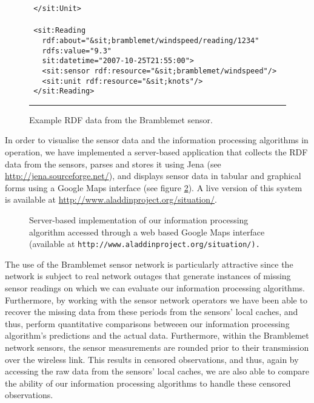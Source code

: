 \documentclass{acmtrans2m}
\begin{document}
\begin{figure}
\begin{minipage}{2.6in}
\begin{tabbing}
\tt\scriptsize \ </\color{red}sit:Unit\color{black}>\\
\\
\tt\scriptsize \ <\color{red}sit:Reading\color{black}\\
\tt\scriptsize \ \ \ rdf:about=\color{blue}"\&sit;bramblemet/windspeed/reading/1234"\color{black}\\
\tt\scriptsize \ \ \ rdfs:value=\color{blue}"9.3"\color{black}\\
\tt\scriptsize \ \ \ sit:datetime=\color{blue}"2007-10-25T21:55:00"\color{black}>\\
\tt\scriptsize \ \ \ <\color{red}sit:sensor\color{black}~rdf:resource=\color{blue}"\&sit;bramblemet/windspeed"\color{black}/>\\
\tt\scriptsize \ \ \ <\color{red}sit:unit\color{black}~rdf:resource=\color{blue}"\&sit;knots"\color{black}/>\\
\tt\scriptsize \ </\color{red}sit:Reading\color{black}>\\
\normalsize
\end{tabbing}
\end{minipage}\par
\rule{3.3in}{.005in} 
\caption{Example RDF data from the Bramblemet sensor.}
\label{rdf}
\end{figure}

In order to visualise the sensor data and the information processing algorithms in operation, we have implemented a server-based application that collects the RDF data from the sensors, parses and stores it using Jena (see \url{http://jena.sourceforge.net/}), and displays sensor data in tabular and graphical forms using a Google Maps interface (see figure \ref{screen}). A live version of this system is available at \url{http://www.aladdinproject.org/situation/}.

\begin{figure}
\begin{center}
\caption{Server-based implementation of our information processing algorithm accessed through a web based Google Maps interface (available at \tt{http://www.aladdinproject.org/situation/}).}
\label{screen}
\end{center}
\end{figure}

The use of the Bramblemet sensor network is particularly attractive since the network is subject to real network outages that generate instances of missing sensor readings on which we can evaluate our information processing algorithms. Furthermore, by working with the sensor network operators we have been able to recover the missing data from these periods from the sensors' local caches, and thus, perform quantitative comparisons betweeen our information processing algorithm's predictions and the actual data. Furthermore, within the Bramblemet network sensors, the sensor measurements are rounded prior to their transmission over the wireless link. This results in censored observations, and thus, again by accessing the raw data from the sensors' local caches, we are also able to compare the ability of our information processing algorithms to handle these censored observations.
\end{document}
